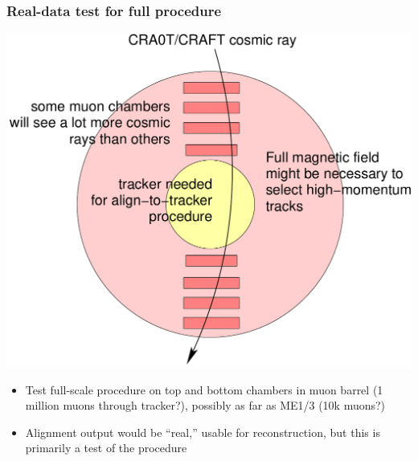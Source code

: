 \documentclass[compress]{beamer}
\begin{document}
\begin{frame}
\frametitle{Real-data test for full procedure}
\begin{center}
\includegraphics[width=0.7\linewidth]{craft.pdf}
\end{center}

\scriptsize
\begin{itemize}
\item Test full-scale procedure on top and bottom chambers in muon
barrel (1 million muons through tracker?), possibly as far as ME1/3 (10k muons?)

\item Alignment output would be ``real,'' usable for reconstruction,
but this is primarily a test of the procedure
\end{itemize}
\end{frame}
\end{document}
